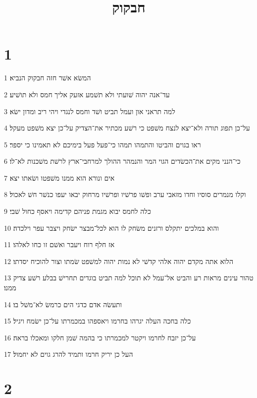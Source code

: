 

\title{חבקוק}


\chapter{1}

\par 1 המשׂא אשׁר חזה חבקוק הנביא׃
\par 2 עד־אנה יהוה שׁועתי ולא תשׁמע אזעק אליך חמס ולא תושׁיע׃
\par 3 למה תראני און ועמל תביט ושׁד וחמס לנגדי ויהי ריב ומדון ישׂא׃
\par 4 על־כן תפוג תורה ולא־יצא לנצח משׁפט כי רשׁע מכתיר את־הצדיק על־כן יצא משׁפט מעקל׃
\par 5 ראו בגוים והביטו והתמהו תמהו כי־פעל פעל בימיכם לא תאמינו כי יספר׃
\par 6 כי־הנני מקים את־הכשׂדים הגוי המר והנמהר ההולך למרחבי־ארץ לרשׁת משׁכנות לא־לו׃
\par 7 אים ונורא הוא ממנו משׁפטו ושׂאתו יצא׃
\par 8 וקלו מנמרים סוסיו וחדו מזאבי ערב ופשׁו פרשׁיו ופרשׁיו מרחוק יבאו יעפו כנשׁר חשׁ לאכול׃
\par 9 כלה לחמס יבוא מגמת פניהם קדימה ויאסף כחול שׁבי׃
\par 10 והוא במלכים יתקלס ורזנים משׂחק לו הוא לכל־מבצר ישׂחק ויצבר עפר וילכדה׃
\par 11 אז חלף רוח ויעבר ואשׁם זו כחו לאלהו׃
\par 12 הלוא אתה מקדם יהוה אלהי קדשׁי לא נמות יהוה למשׁפט שׂמתו וצור להוכיח יסדתו׃
\par 13 טהור עינים מראות רע והביט אל־עמל לא תוכל למה תביט בוגדים תחרישׁ בבלע רשׁע צדיק ממנו׃
\par 14 ותעשׂה אדם כדגי הים כרמשׂ לא־משׁל בו׃
\par 15 כלה בחכה העלה יגרהו בחרמו ויאספהו במכמרתו על־כן ישׂמח ויגיל׃
\par 16 על־כן יזבח לחרמו ויקטר למכמרתו כי בהמה שׁמן חלקו ומאכלו בראה׃
\par 17 העל כן יריק חרמו ותמיד להרג גוים לא יחמול׃

\chapter{2}

